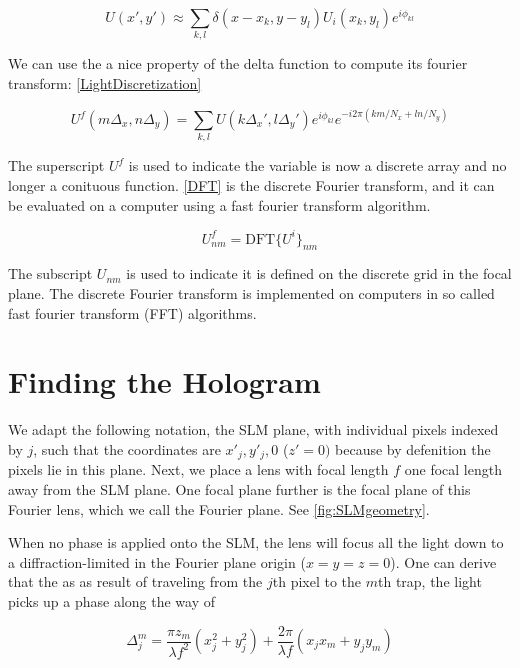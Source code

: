 \begin{equation}\label{LightDiscretization}
    U(x',y') \approx \sum_{k,l} \delta(x-x_k, y-y_l)  U_i(x_k,y_l) e^{i \phi_{kl}}
\end{equation}

We can use the a nice property of the delta function to compute its fourier transform: \cref{LightDiscretization} 

\begin{equation}\label{DFT}
    U^f(m \Delta_x, n \Delta_y) = \sum_{k,l} U(k \Delta_x',l \Delta_y') e^{i \phi_{kl}} e^{-i 2\pi (km/N_x+ln/N_y)}
\end{equation}

The superscript $U^f$ is used to indicate the variable is now a discrete array and no longer a conituous function. \cref{DFT} is the discrete Fourier transform, and it can be evaluated on a computer using a fast fourier transform algorithm. 

\begin{equation}\label{DFTshort}
    U^f_{nm} = \text{DFT}\{U^i\}_{nm}
\end{equation}

The subscript $U_{nm}$ is used to indicate it is defined on the discrete grid in the focal plane. The discrete Fourier transform is implemented on computers in so called fast fourier transform (FFT) algorithms. 

\section{Finding the Hologram}\label{sec:IFTA}

We adapt the following notation, the \ac{SLM} plane, with individual pixels indexed by $j$, such that the coordinates are $x'_j, y'_j,0$ ($z'=0)$ because by defenition the pixels lie in this plane. Next, we place a lens with focal length $f$ one focal length away from the SLM plane. One focal plane further is the focal plane of this Fourier lens, which we call the Fourier plane. See \cref{fig:SLMgeometry}. 

When no phase is applied onto the SLM, the lens will focus all the light down to a diffraction-limited in the Fourier plane origin ($x=y=z=0$). One can derive that the as as result of traveling from the $j$th pixel to the $m$th trap, the light picks up a phase along the way of 

\begin{equation}
    \Delta_j^m = \frac{\pi z_m}{\lambda f^2}(x_j^2+y_j^2)+\frac{2\pi}{\lambda f}(x_j x_m +y_j y_m)
\end{equation}


